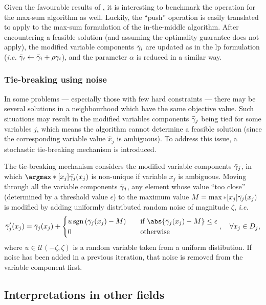 Given the favourable results of \textcite{Bastert10}, it is interesting to benchmark the operation for the max-sum algorithm as well.
Luckily, the \enquote{push} operation is easily translated to apply to the max-sum formulation of the in-the-middle algorithm.
After encountering a feasible solution (and assuming the optimality guarantee does not apply), the modified variable components \(\bar{\gamma}_i\) are updated as in the \gls{lp} formulation (\emph{i.e.} \(\bar{\gamma}_i\leftarrow\bar{\gamma}_i+\rho\gamma_i\)), and the parameter \(\alpha\) is reduced in a similar way.

\subsubsection{Tie-breaking using noise}
In some problems --- especially those with few hard constraints --- there may be several solutions in a neighbourhood which have the same objective value.
Such situations may result in the modified variables components \(\bar{\gamma}_j\) being tied for some variables \(j\), which means the algorithm cannot determine a feasible solution (since the corresponding variable value \(\hat{x}_j\) is ambiguous).
To address this issue, a stochastic tie-breaking mechanism is introduced.

The tie-breaking mechanism considers the modified variable components \(\bar{\gamma}_j\), in which \(\argmax*[x_j]{\bar{\vcomp_j}(x_j)}\) is non-unique if variable \(x_j\) is ambiguous.
Moving through all the variable components \(\bar{\gamma}_j\), any element whose value \enquote{too close} (determined by a threshold value \(\epsilon\)) to the maximum value \(M = \max*[x_j]{\bar{\ensuremath{\gamma}_j}(x_j)}\) is modified by adding uniformly distributed random noise of magnitude \(\zeta\), \emph{i.e.}
\begin{equation*}
	\bar{\vcomp}'_j(x_j) = \bar{\vcomp}_j(x_j) + \begin{cases}
		u \sgn{\bar{\vcomp}_j(x_j) - M} \quad & \text{if \(\abs{\bar{\vcomp}_j(x_j) - M} \leq \epsilon\)} \\
		0 & \text{otherwise}
	\end{cases}, \quad \forall x_j \in D_j,
\end{equation*}
where \(u \in \mathcal{U}(-\zeta,\zeta)\) is a random variable taken from a uniform distibution.
If noise has been added in a previous iteration, that noise is removed from the variable component first.

\subsection{Interpretations in other fields}
% 
% 

